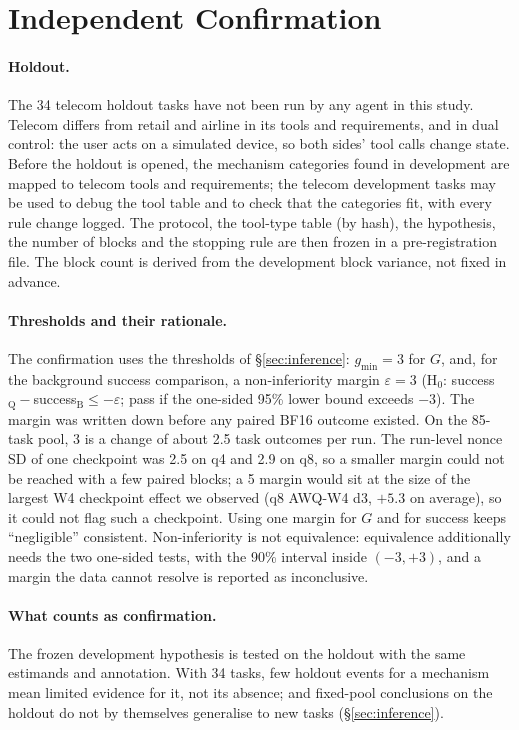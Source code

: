 \section{Independent Confirmation}
\label{sec:confirm}

\paragraph{Holdout.} The 34 telecom holdout tasks have not been run by any agent in this study. Telecom differs from retail and airline in its tools and requirements, and in dual control: the user acts on a simulated device, so both sides' tool calls change state. Before the holdout is opened, the mechanism categories found in development are mapped to telecom tools and requirements; the telecom development tasks may be used to debug the tool table and to check that the categories fit, with every rule change logged. The protocol, the tool-type table (by hash), the hypothesis, the number of blocks and the stopping rule are then frozen in a pre-registration file. The block count is derived from the development block variance, not fixed in advance.

\paragraph{Thresholds and their rationale.} The confirmation uses the thresholds of \S\ref{sec:inference}: $g_{\min}=3$\pp{} for $G$, and, for the background success comparison, a non-inferiority margin $\varepsilon=3$\pp{} (H$_0$: success$_{\mathrm{Q}}-$success$_{\mathrm{B}}\le-\varepsilon$; pass if the one-sided 95\% lower bound exceeds $-3$\pp{}). The margin was written down before any paired BF16 outcome existed. On the 85-task pool, 3\pp{} is a change of about 2.5 task outcomes per run. The run-level nonce SD of one checkpoint was 2.5\pp{} on q4 and 2.9\pp{} on q8, so a smaller margin could not be reached with a few paired blocks; a 5\pp{} margin would sit at the size of the largest W4 checkpoint effect we observed (q8 AWQ-W4 d3, $+5.3$\pp{} on average), so it could not flag such a checkpoint. Using one margin for $G$ and for success keeps ``negligible'' consistent. Non-inferiority is not equivalence: equivalence additionally needs the two one-sided tests, with the 90\% interval inside $(-3,+3)$\pp{}, and a margin the data cannot resolve is reported as inconclusive.

\paragraph{What counts as confirmation.} The frozen development hypothesis is tested on the holdout with the same estimands and annotation. With 34 tasks, few holdout events for a mechanism mean limited evidence for it, not its absence; and fixed-pool conclusions on the holdout do not by themselves generalise to new tasks (\S\ref{sec:inference}).

